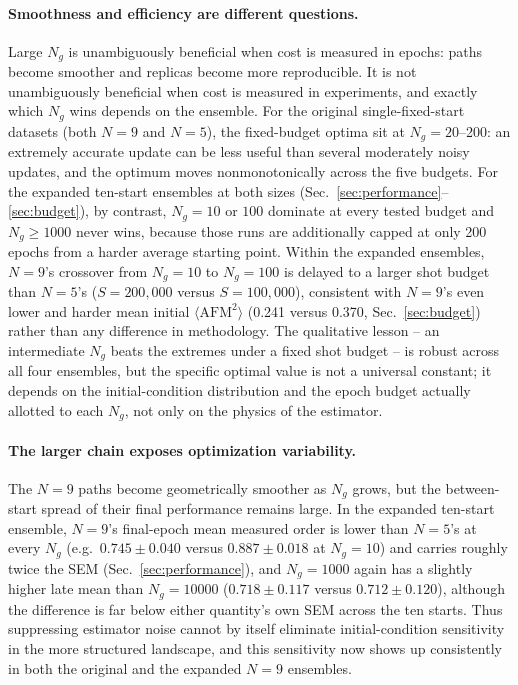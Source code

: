 \documentclass[11pt]{article}
\begin{document}
\paragraph{Smoothness and efficiency are different questions.}
Large $N_g$ is unambiguously beneficial when cost is measured in epochs: paths become
smoother and replicas become more reproducible.  It is not unambiguously beneficial
when cost is measured in experiments, and exactly which $N_g$ wins depends on the
ensemble.  For the original single-fixed-start datasets (both $N=9$ and $N=5$), the
fixed-budget optima sit at $N_g=20$--200: an extremely accurate update can be less
useful than several moderately noisy updates, and the optimum moves nonmonotonically
across the five budgets.  For the expanded ten-start ensembles at both sizes
(Sec.~\ref{sec:performance}--\ref{sec:budget}), by contrast, $N_g=10$ or $100$
dominate at every tested budget and $N_g\ge1000$ never wins, because those runs are
additionally capped at only 200 epochs from a harder average starting point.
Within the expanded ensembles, $N=9$'s crossover from $N_g=10$ to $N_g=100$ is
delayed to a larger shot budget than $N=5$'s ($S=200{,}000$ versus $S=100{,}000$),
consistent with $N=9$'s even lower and harder mean initial
$\langle\mathrm{AFM}^2\rangle$ (0.241 versus 0.370, Sec.~\ref{sec:budget}) rather
than any difference in methodology.  The qualitative lesson -- an intermediate
$N_g$ beats the extremes under a fixed shot budget -- is robust across all four
ensembles, but the specific optimal value is not a universal constant; it depends
on the initial-condition distribution and the epoch budget actually allotted to
each $N_g$, not only on the physics of the estimator.

\paragraph{The larger chain exposes optimization variability.}
The $N=9$ paths become geometrically smoother as $N_g$ grows, but the between-start
spread of their final performance remains large.  In the expanded ten-start
ensemble, $N=9$'s final-epoch mean measured order is lower than $N=5$'s at every
$N_g$ (e.g.\ $0.745\pm0.040$ versus $0.887\pm0.018$ at $N_g=10$) and carries roughly
twice the SEM (Sec.~\ref{sec:performance}), and $N_g=1000$ again has a slightly
higher late mean than $N_g=10000$ ($0.718\pm0.117$ versus $0.712\pm0.120$), although
the difference is far below either quantity's own SEM across the ten starts.  Thus
suppressing estimator noise cannot by itself eliminate initial-condition sensitivity
in the more structured landscape, and this sensitivity now shows up consistently in
both the original and the expanded $N=9$ ensembles.
\end{document}
